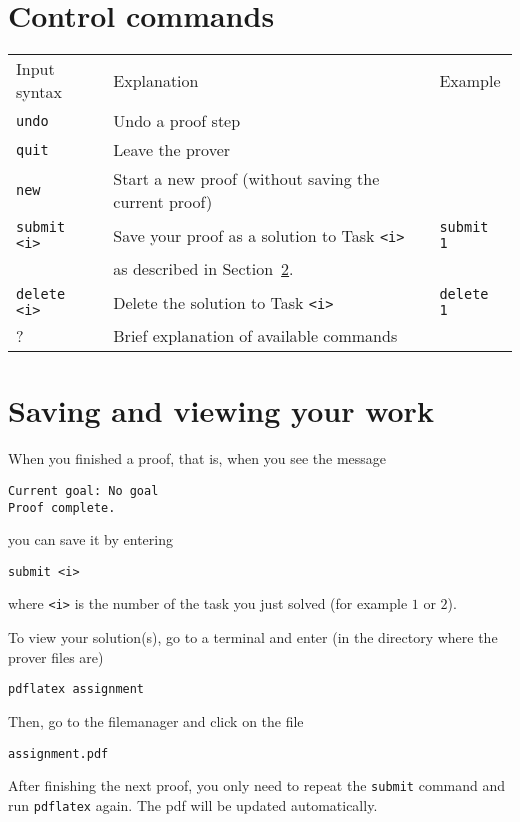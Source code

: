 \documentclass[12pt]{article}
\begin{document}
\section{Control commands}
\label{sec-control}

\begin{center}
\begin{tabular}{lll}
Input syntax & Explanation & Example
\\[1em]
\verb|undo|   &  Undo a proof step & \\[1em]
\verb|quit|   &  Leave the prover & \\[1em]
\verb|new|    &  Start a new proof (without saving the current proof) & \\[1em]
\verb|submit <i>| & Save your proof as a solution to Task \verb|<i>|
                 & \verb|submit 1|\\
              & as described in Section~\ref{sec-save}.&\\[1em]
\verb|delete <i>|   & Delete the solution to Task \verb|<i>|
                 & \verb|delete 1|\\[1em]
?            &Brief explanation of available commands
\end{tabular}
\end{center}



\section{Saving and viewing your work}
\label{sec-save}

When you finished a proof, that is, when you see the message
\begin{verbatim}
Current goal: No goal
Proof complete.
\end{verbatim}
you can save it by entering
\begin{verbatim}
submit <i>
\end{verbatim}
where \verb|<i>| is the number of the task you just solved (for example $1$ or $2$).

To view your solution(s), go to a terminal and enter (in the directory where
the prover files are)
%
\begin{verbatim}
pdflatex assignment
\end{verbatim}
Then, go to the filemanager and click on the file
\begin{verbatim}
assignment.pdf
\end{verbatim}

After finishing the next proof, you only need to repeat
the \verb|submit| command and run \verb|pdflatex| again. 
The pdf will be updated automatically.
\end{document}
